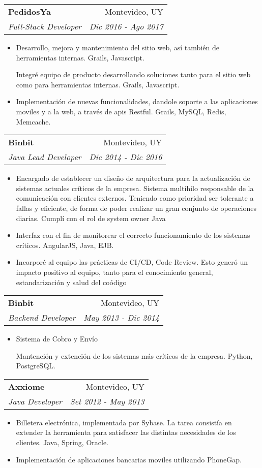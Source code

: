 \documentclass[letterpaper,11pt]{article}
\makeatletter
\newcommand{\workItem}[1]{
      \item\small{
        { #1 \vspace{-2pt}}
      }
    }
\newcommand{\resumeSubheading}[4]{
      \vspace{-1pt}\item
        \begin{tabular*}{0.97\textwidth}{l@{\extracolsep{\fill}}r}
          \textbf{#1} & #2 \\
          \textit{\small#3} & \textit{\small #4} \\
        \end{tabular*}\vspace{-5pt}
    }
\newcommand{\resumeItemListStart}{\begin{itemize}}
\newcommand{\resumeItemListEnd}{\end{itemize}\vspace{-5pt}}
\makeatother
\begin{document}
        \resumeSubheading
          {PedidosYa}{Montevideo, UY}
          {Full-Stack Developer}{Dic 2016 - Ago 2017}
          \resumeItemListStart
            \workItem
              {Desarrollo, mejora y mantenimiento del sitio web, as\'i tambi\'en de herramientas internas. Grails, Javascript.}
              {Integr\'e equipo de producto desarrollando soluciones tanto para el sitio web como para herramientas internas. Grails, Javascript.}
            \workItem
              {Implementaci\'on de nuevas funcionalidades, dandole soporte a las aplicaciones moviles y a la web, a trav\'es de apis Restful. Grails, MySQL, Redis, Memcache.}
          \resumeItemListEnd

        \resumeSubheading
          {Binbit}{Montevideo, UY}
          {Java Lead Developer}{Dic 2014 - Dic 2016}
          \resumeItemListStart
            \workItem
              {Encargado de establecer un diseño de arquitectura para la actualización de sistemas actuales cr\'iticos de la empresa. Sistema multihilo responsable de la comunicaci\'on con clientes externos. Teniendo como prioridad ser tolerante a fallas y eficiente, de forma de poder realizar un gran conjunto de operaciones diarias. Cumpl\'i con el rol de system owner Java}
            \workItem
              {Interfaz con el fin de monitorear el correcto funcionamiento de los sistemas cr\'iticos. AngularJS, Java, EJB.}
            \workItem
              {Incorpor\'e al equipo las pr\'acticas de CI/CD, Code Review. Esto gener\'o un impacto positivo al equipo, tanto para el conocimiento general, estandarización y salud del co\'odigo}
          \resumeItemListEnd

        \resumeSubheading
          {Binbit}{Montevideo, UY}
          {Backend Developer}{May 2013 - Dic 2014}
          \resumeItemListStart
            \workItem{Sistema de Cobro y Env\'io}
              {Mantenci\'on y extenci\'on de los sistemas m\'as cr\'iticos de la empresa. Python, PostgreSQL.}
          \resumeItemListEnd

        \resumeSubheading
          {Axxiome}{Montevideo, UY}
          {Java Developer}{Set 2012 - May 2013}
          \resumeItemListStart
            \workItem
              {Billetera electr\'onica, implementada por Sybase. La tarea consist\'ia en extender la herramienta para satisfacer las distintas necesidades de los clientes. Java, Spring, Oracle.}
            \workItem
              {Implementaci\'on de aplicaciones bancarias moviles utilizando PhoneGap.}
          \resumeItemListEnd
\end{document}
